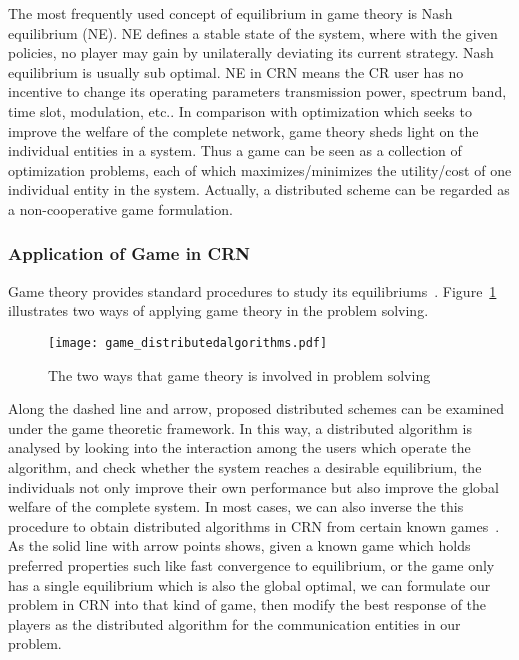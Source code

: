 The most frequently used concept of equilibrium in game theory is Nash equilibrium (\gls{NE}).
NE defines a stable state of the system, where with the given policies, no player may gain by unilaterally deviating its current strategy.
Nash equilibrium is usually sub optimal.
NE in CRN means the CR user has no incentive to change its operating parameters \eg transmission power, spectrum band, time slot, modulation, etc.. 
In comparison with optimization which seeks to improve the welfare of the complete network, game theory sheds light on the individual entities in a system.
Thus a game can be seen as a collection of optimization problems, each of which maximizes/minimizes the utility/cost of one individual entity in the system.
Actually, a distributed scheme can be regarded as a non-cooperative game formulation. 

\subsubsection{Application of Game in CRN}
Game theory provides standard procedures to study its equilibriums~\cite{game_for_communication_01}.
Figure~\ref{game_distributedalgorithms} illustrates two ways of applying game theory in the problem solving.
\begin{figure}[h!]
  \centering
  \texttt{[image: game\_distributedalgorithms.pdf]}
  \caption{The two ways that game theory is involved in problem solving}
\label{game_distributedalgorithms}
\end{figure}

Along the dashed line and arrow, proposed distributed schemes can be examined under the game theoretic framework.
In this way, a distributed algorithm is analysed by looking into the interaction among the users which operate the algorithm, and check whether the system reaches a desirable equilibrium, \ie the individuals not only improve their own performance but also improve the global welfare of the complete system.
In most cases, we can also inverse the this procedure to obtain distributed algorithms in CRN from certain known games~\cite{altman_Smodel_pc_2003}.
As the solid line with arrow points shows, given a known game which holds preferred properties such like fast convergence to equilibrium, or the game only has a single equilibrium which is also the global optimal, we can formulate our problem in CRN into that kind of game, then modify the best response of the players as the distributed algorithm for the communication entities in our problem. 

